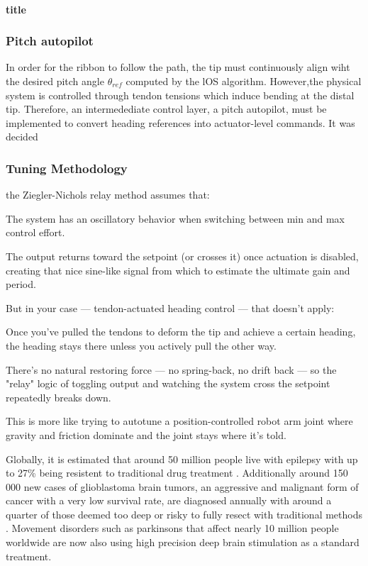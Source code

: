\paragraph*{title}

\subsubsection{Pitch autopilot}
In order for the ribbon to follow the path, the tip must continuously align wiht the desired pitch angle \(\theta_{ref}\) computed by the lOS algorithm. However,the physical system is controlled through tendon tensions which induce bending at the distal tip. Therefore, an intermedediate control layer, a pitch autopilot, must be implemented to convert heading references into actuator-level commands.
\newline \newline
It was decided 

\subsubsection{Tuning Methodology}
the Ziegler-Nichols relay method assumes that:

The system has an oscillatory behavior when switching between min and max control effort.

The output returns toward the setpoint (or crosses it) once actuation is disabled, creating that nice sine-like signal from which to estimate the ultimate gain and period.

But in your case — tendon-actuated heading control — that doesn’t apply:

Once you've pulled the tendons to deform the tip and achieve a certain heading, the heading stays there unless you actively pull the other way.

There’s no natural restoring force — no spring-back, no drift back — so the "relay" logic of toggling output and watching the system cross the setpoint repeatedly breaks down.

This is more like trying to autotune a position-controlled robot arm joint where gravity and friction dominate and the joint stays where it's told.



Globally, it is estimated that around 50 million people live with epilepsy \cite{noauthor_epilepsy_nodate} with up to 27\% being resistent to traditional drug treatment \cite{sultana_incidence_2021}. Additionally around 150 000 new cases of glioblastoma brain tumors, an aggressive and malignant form of cancer with a very low survival rate, are diagnosed annually \cite{walsh_chapter_2016} with around a quarter of those deemed too deep or risky to fully resect with traditional methods \cite{vivas-buitrago_influence_2021}. Movement disorders such as parkinsons that affect nearly 10 million people worldwide are now also using high precision deep brain stimulation as a standard treatment.